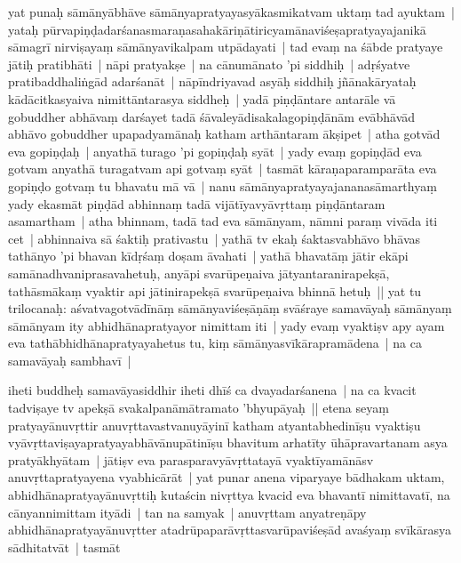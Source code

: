 \documentclass[article,a4paper]{memoir}
\newcommand{\persName}[1]{#1}
\begin{document}
	  \pstart yat punaḥ sā\-mā\-nyā\-bhā\-ve sā\-mā\-nyapratyayasyā\-kasmikatvam uktaṃ tad ayuktam | yataḥ pū\-rvapiṇḍadarśanasmaraṇasahakā\-riṇā\-tiricyamā\-naviśeṣapratyayajanikā\- sā\-magrī\- nirviṣayaṃ sā\-mā\-nyavikalpam utpā\-dayati | tad evaṃ na śā\-bde pratyaye jā\-tiḥ pratibhā\-ti | nā\-pi pratyakṣe | na cā\-numā\-nato 'pi siddhiḥ | adṛśyatve pratibaddhaliṅgā\-d adarśanā\-t | nā\-pī\-ndriyavad asyā\-ḥ siddhiḥ jñā\-nakā\-ryataḥ kā\-dā\-citkasyaiva nimittā\-ntarasya siddheḥ | yadā\- piṇḍā\-ntare antarā\-le vā\- gobuddher abhā\-vaṃ darśayet tadā\- śā\-valeyā\-disakalagopiṇḍā\-nā\-m evā\-bhā\-vā\-d abhā\-vo gobuddher upapadyamā\-naḥ katham arthā\-ntaram ā\-kṣipet | atha gotvā\-d eva gopiṇḍaḥ | anyathā\- turago 'pi gopiṇḍaḥ syā\-t | yady evaṃ gopiṇḍā\-d eva gotvam anyathā\- turagatvam api gotvaṃ syā\-t | tasmā\-t kā\-raṇaparamparā\-ta eva gopiṇḍo gotvaṃ tu bhavatu mā\- vā\- | nanu sā\-mā\-nyapratyayajananasā\-marthyaṃ yady ekasmā\-t piṇḍā\-d abhinnaṃ tadā\- vijā\-tī\-yavyā\-vṛttaṃ piṇḍā\-ntaram asamartham | atha bhinnam, tadā\- tad eva sā\-mā\-nyam, nā\-mni paraṃ vivā\-da iti cet | abhinnaiva sā\- śaktiḥ prativastu | yathā\- tv ekaḥ śaktasvabhā\-vo bhā\-vas tathā\-nyo 'pi bhavan kī\-dṛśaṃ doṣam ā\-vahati | yathā\- bhavatā\-ṃ jā\-tir ekā\-pi samā\-nadhvaniprasavahetuḥ, anyā\-pi svarū\-peṇaiva jā\-tyantaranirapekṣā\-, tathā\-smā\-kaṃ vyaktir api jā\-tinirapekṣā\- svarū\-peṇaiva bhinnā\- hetuḥ || \label{thakur75-64.7} yat tu \persName{trilocanaḥ}: aśvatvagotvā\-dī\-nā\-ṃ sā\-mā\-nyaviśeṣā\-ṇā\-ṃ svā\-śraye samavā\-yaḥ sā\-mā\-nyaṃ sā\-mā\-nyam ity abhidhā\-napratyayor nimittam iti | yady evaṃ vyaktiṣv apy ayam eva tathā\-bhidhā\-napratyayahetus tu, kiṃ sā\-mā\-nyasvī\-kā\-rapramā\-dena | na ca samavā\-yaḥ sambhavī\- |
	\pend
      

	  \pstart iheti buddheḥ samavā\-yasiddhir iheti dhī\-ś ca dvayadarśanena | na ca kvacit tadviṣaye tv apekṣā\- svakalpanā\-mā\-tramato 'bhyupā\-yaḥ || \label{thakur75-64.15} etena seyaṃ pratyayā\-nuvṛttir anuvṛttavastvanuyā\-yinī\- katham atyantabhedinī\-ṣu vyaktiṣu vyā\-vṛttaviṣayapratyayabhā\-vā\-nupā\-tinī\-ṣu bhavitum arhatī\-ty ū\-hā\-pravartanam asya pratyā\-khyā\-tam | jā\-tiṣv eva parasparavyā\-vṛttatayā\- vyaktī\-yamā\-nā\-sv anuvṛttapratyayena vyabhicā\-rā\-t | \label{thakur75-64.19} yat punar anena viparyaye bā\-dhakam uktam, abhidhā\-napratyayā\-nuvṛttiḥ kutaścin nivṛttya kvacid eva bhavantī\- nimittavatī\-, na cā\-nyannimittam ityā\-di | tan na samyak | anuvṛttam anyatreṇā\-py abhidhā\-napratyayā\-nuvṛtter atadrū\-paparā\-vṛttasvarū\-paviśeṣā\-d avaśyaṃ svī\-kā\-rasya sā\-dhitatvā\-t | tasmā\-t
	\pend
      
\end{document}
